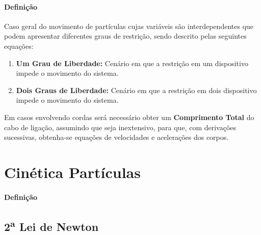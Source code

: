 \documentclass{article}
\begin{document}
            \paragraph{Definição}Caso geral do movimento de partículas cujas variáveis são interdependentes que podem apresentar diferentes graus de restrição, sendo descrito pelas seguintes equações:
                \begin{enumerate}[noitemsep]
                    \item \textbf{Um Grau de Liberdade:} Cenário em que a restrição em um dispositivo impede o movimento do sistema.
                    \item \textbf{Dois Graus de Liberdade:} Cenário em que a restrição em dois dispositivo impede o movimento do sistema.
                \end{enumerate}
            Em casos envolvendo cordas será necessário obter um \textbf{Comprimento Total} do cabo de ligação, assumindo que seja inextensivo, para que, com derivações sucessivas, obtenha-se equações de velocidades e acelerações dos corpos.
\newpage

    \section{Cinética Partículas}
        \paragraph{Definição}

        \subsection{2\textsuperscript{a} Lei de Newton}
\end{document}
